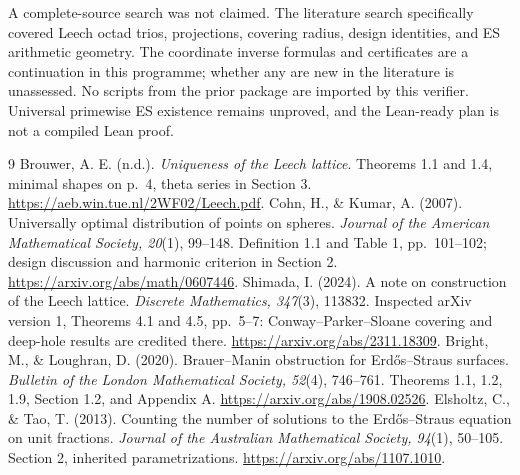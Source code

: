 \documentclass[11pt,reqno]{amsart}
\theoremstyle{definition}\newtheorem{definition}[theorem]{Definition}
\theoremstyle{remark}\newtheorem{remark}[theorem]{Remark}
\begin{document}
A complete-source search was not claimed. The literature search specifically covered Leech octad trios, projections, covering radius, design identities, and ES arithmetic geometry. The coordinate inverse formulas and certificates are a continuation in this programme; whether any are new in the literature is unassessed. No scripts from the prior package are imported by this verifier. Universal primewise ES existence remains unproved, and the Lean-ready plan is not a compiled Lean proof.

\begin{thebibliography}{9}
 Brouwer, A. E. (n.d.). \emph{Uniqueness of the Leech lattice}. Theorems 1.1 and 1.4, minimal shapes on p.~4, theta series in Section 3. \url{https://aeb.win.tue.nl/2WF02/Leech.pdf}.
 Cohn, H., \& Kumar, A. (2007). Universally optimal distribution of points on spheres. \emph{Journal of the American Mathematical Society, 20}(1), 99--148. Definition 1.1 and Table 1, pp.~101--102; design discussion and harmonic criterion in Section 2. \url{https://arxiv.org/abs/math/0607446}.
 Shimada, I. (2024). A note on construction of the Leech lattice. \emph{Discrete Mathematics, 347}(3), 113832. Inspected arXiv version 1, Theorems 4.1 and 4.5, pp.~5--7: Conway--Parker--Sloane covering and deep-hole results are credited there. \url{https://arxiv.org/abs/2311.18309}.
 Bright, M., \& Loughran, D. (2020). Brauer--Manin obstruction for Erd\H{o}s--Straus surfaces. \emph{Bulletin of the London Mathematical Society, 52}(4), 746--761. Theorems 1.1, 1.2, 1.9, Section 1.2, and Appendix A. \url{https://arxiv.org/abs/1908.02526}.
 Elsholtz, C., \& Tao, T. (2013). Counting the number of solutions to the Erd\H{o}s--Straus equation on unit fractions. \emph{Journal of the Australian Mathematical Society, 94}(1), 50--105. Section 2, inherited parametrizations. \url{https://arxiv.org/abs/1107.1010}.
\end{thebibliography}
\end{document}

